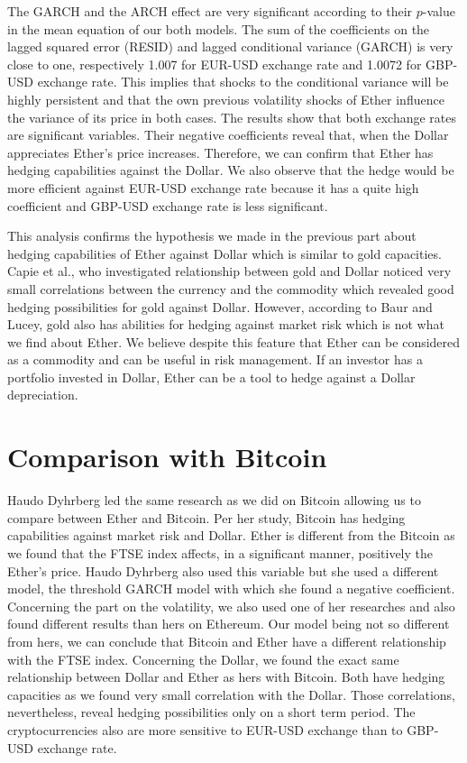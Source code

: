 \documentclass[11pt]{report}
\begin{document}
The GARCH and the ARCH effect are very significant according to their $p$-value in the mean equation of our both models. The sum of the coefficients on the lagged squared error (RESID) and lagged conditional variance (GARCH) is very close to one, respectively 1.007 for EUR-USD exchange rate and 1.0072 for GBP-USD exchange rate. This implies that shocks to the conditional variance will be highly persistent and that the own previous volatility shocks of Ether influence the variance of its price in both cases. 
The results show that both exchange rates are significant variables. Their negative coefficients reveal that, when the Dollar appreciates Ether’s price increases.  Therefore, we can confirm that Ether has hedging capabilities against the Dollar. We also observe that the hedge would be more efficient against EUR-USD exchange rate because it has a quite high coefficient and GBP-USD exchange rate is less significant.\clearpage
 
This analysis confirms the hypothesis we made in the previous part about hedging capabilities of Ether against Dollar which is similar to gold capacities. Capie et al.\cite{CAPIE}, who investigated relationship between gold and Dollar noticed very small correlations between the currency and the commodity which revealed good hedging possibilities for gold against Dollar.  However, according to Baur and Lucey, gold also has abilities for hedging against market risk which is not what we find about Ether. We believe despite this feature that Ether can be considered as a commodity and can be useful in risk management. If an investor has a portfolio invested in Dollar, Ether can be a tool to hedge against a Dollar depreciation.  
 

\clearpage		
\section{Comparison with Bitcoin}

Haudo Dyhrberg \cite{HAUDO2} led the same research as we did on Bitcoin allowing us to compare between Ether and Bitcoin.\newline
Per her study, Bitcoin has hedging capabilities against market risk and Dollar. Ether is different from the Bitcoin as we found that the FTSE index affects, in a significant manner, positively the Ether’s price. Haudo Dyhrberg also used this variable but she used a different model, the threshold GARCH model with which she found a negative coefficient. Concerning the part on the volatility, we also used one of her researches and also found different results than hers on Ethereum. Our model being not so different from hers, we can conclude that Bitcoin and Ether have a different relationship with the FTSE index.   \newline
Concerning the Dollar, we found the exact same relationship between Dollar and Ether as hers with Bitcoin. Both have hedging capacities as we found very small correlation with the Dollar. Those correlations, nevertheless, reveal hedging possibilities only on a short term period. The cryptocurrencies also are more sensitive to EUR-USD exchange than to GBP-USD exchange rate. \newline
\end{document}

